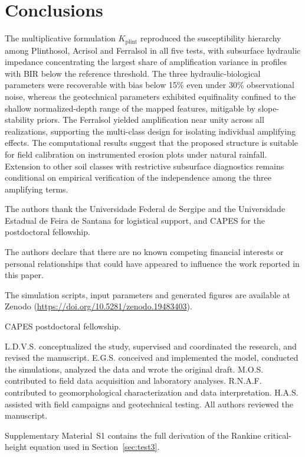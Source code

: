 \documentclass[pdflatex,sn-basic,referee,lineno]{sn-jnl}
\begin{document}
\section{Conclusions}
\label{sec:conclusions}

The multiplicative formulation $K_{\mathrm{plint}}$ reproduced the susceptibility hierarchy among Plinthosol, Acrisol and Ferralsol in all five tests, with subsurface hydraulic impedance concentrating the largest share of amplification variance in profiles with BIR below the reference threshold. The three hydraulic-biological parameters were recoverable with bias below 15\% even under 30\% observational noise, whereas the geotechnical parameters exhibited equifinality confined to the shallow normalized-depth range of the mapped features, mitigable by slope-stability priors. The Ferralsol yielded amplification near unity across all realizations, supporting the multi-class design for isolating individual amplifying effects. The computational results suggest that the proposed structure is suitable for field calibration on instrumented erosion plots under natural rainfall. Extension to other soil classes with restrictive subsurface diagnostics remains conditional on empirical verification of the independence among the three amplifying terms.

\backmatter
\hypersetup{bookmarksdepth=1}

The authors thank the Universidade Federal de Sergipe and the Universidade Estadual de Feira de Santana for logistical support, and CAPES for the postdoctoral fellowship.

 The authors declare that there are no known competing financial interests or personal relationships that could have appeared to influence the work reported in this paper.

 The simulation scripts, input parameters and generated figures are available at Zenodo (\url{https://doi.org/10.5281/zenodo.19483403}).

 CAPES postdoctoral fellowship.

 L.D.V.S. conceptualized the study, supervised and coordinated the research, and revised the manuscript. E.G.S. conceived and implemented the model, conducted the simulations, analyzed the data and wrote the original draft. M.O.S. contributed to field data acquisition and laboratory analyses. R.N.A.F. contributed to geomorphological characterization and data interpretation. H.A.S. assisted with field campaigns and geotechnical testing. All authors reviewed the manuscript.

 Supplementary Material~S1 contains the full derivation of the Rankine critical-height equation used in Section~\ref{sec:test3}.


\end{document}
